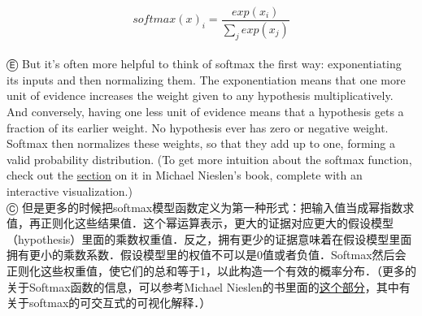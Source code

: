 \begin{equation}
softmax(x)_i = \frac{exp(x_i)}{\sum_j{exp(x_j)}}
\end{equation}\\
Ⓔ But it's often more helpful to think of softmax the first way: exponentiating its inputs and then normalizing them. The exponentiation means that one more unit of evidence increases the weight given to any hypothesis multiplicatively. And conversely, having one less unit of evidence means that a hypothesis gets a fraction of its earlier weight. No hypothesis ever has zero or negative weight. Softmax then normalizes these weights, so that they add up to one, forming a valid probability distribution. (To get more intuition about the softmax function, check out the \href{http://neuralnetworksanddeeplearning.com/chap3.html#softmax}{section} on it in Michael Nieslen's book, complete with an interactive visualization.)\\
Ⓒ 但是更多的时候把softmax模型函数定义为第一种形式：把输入值当成幂指数求值，再正则化这些结果值．这个幂运算表示，更大的证据对应更大的假设模型（hypothesis）里面的乘数权重值．反之，拥有更少的证据意味着在假设模型里面拥有更小的乘数系数．假设模型里的权值不可以是0值或者负值．Softmax然后会正则化这些权重值，使它们的总和等于1，以此构造一个有效的概率分布．（更多的关于Softmax函数的信息，可以参考Michael Nieslen的书里面的\href{http://neuralnetworksanddeeplearning.com/chap3.html#softmax}{这个部分}，其中有关于softmax的可交互式的可视化解释．）

